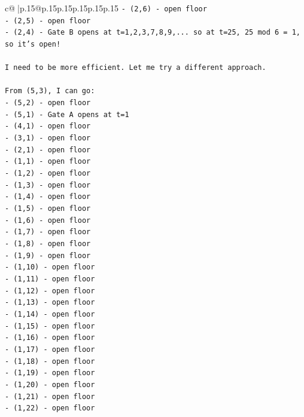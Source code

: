 \documentclass{article}
\begin{document}
{\begin{supertabular}{c@{$\;$}|p{.15\linewidth}@{}p{.15\linewidth}p{.15\linewidth}p{.15\linewidth}p{.15\linewidth}p{.15\linewidth}}
{{{\texttt{{-} (2,6) {-} open floor} \\
\texttt{{-} (2,5) {-} open floor} \\
\texttt{{-} (2,4) {-} Gate B opens at t=1,2,3,7,8,9,... so at t=25, 25 mod 6 = 1, so it's open!} \\
\\ 
\texttt{I need to be more efficient. Let me try a different approach.} \\
\\ 
\texttt{From (5,3), I can go:} \\
\texttt{{-} (5,2) {-} open floor} \\
\texttt{{-} (5,1) {-} Gate A opens at t=1} \\
\texttt{{-} (4,1) {-} open floor} \\
\texttt{{-} (3,1) {-} open floor} \\
\texttt{{-} (2,1) {-} open floor} \\
\texttt{{-} (1,1) {-} open floor} \\
\texttt{{-} (1,2) {-} open floor} \\
\texttt{{-} (1,3) {-} open floor} \\
\texttt{{-} (1,4) {-} open floor} \\
\texttt{{-} (1,5) {-} open floor} \\
\texttt{{-} (1,6) {-} open floor} \\
\texttt{{-} (1,7) {-} open floor} \\
\texttt{{-} (1,8) {-} open floor} \\
\texttt{{-} (1,9) {-} open floor} \\
\texttt{{-} (1,10) {-} open floor} \\
\texttt{{-} (1,11) {-} open floor} \\
\texttt{{-} (1,12) {-} open floor} \\
\texttt{{-} (1,13) {-} open floor} \\
\texttt{{-} (1,14) {-} open floor} \\
\texttt{{-} (1,15) {-} open floor} \\
\texttt{{-} (1,16) {-} open floor} \\
\texttt{{-} (1,17) {-} open floor} \\
\texttt{{-} (1,18) {-} open floor} \\
\texttt{{-} (1,19) {-} open floor} \\
\texttt{{-} (1,20) {-} open floor} \\
\texttt{{-} (1,21) {-} open floor} \\
\texttt{{-} (1,22) {-} open floor} \\
}}}
\end{supertabular}}
\end{document}
